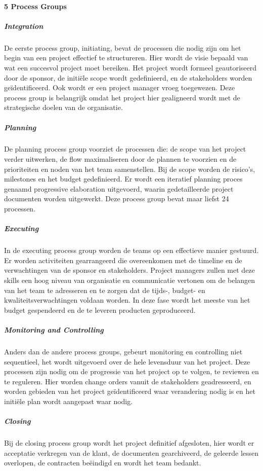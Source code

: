 \documentclass[]{article}
\begin{document}
\paragraph{5 Process Groups}
\subparagraph{Integration}
De eerste process group, initiating, bevat de processen die nodig zijn om het begin van een project effectief te structureren. Hier wordt de visie bepaald van wat een succesvol project moet bereiken.
Het project wordt formeel geautoriseerd door de sponsor, de initiële scope wordt gedefinieerd, en de stakeholders worden geïdentificeerd. Ook wordt er een project manager vroeg toegewezen.
Deze process group is belangrijk omdat het project hier gealigneerd wordt met de strategische doelen van de organisatie. 
\subparagraph{Planning}
De planning process group voorziet de processen die: de scope van het project verder uitwerken, de flow maximaliseren door de plannen te voorzien en de prioriteiten en noden van het team samenstellen.
Bij de scope worden de risico’s, milestones en het budget gedefinieerd. Er wordt een iteratief planning proces genaamd progressive elaboration uitgevoerd, waarin gedetailleerde project documenten worden uitgewerkt. 
Deze process group bevat maar liefst 24 processen. 
\subparagraph{Executing}
In de executing process group worden de teams op een effectieve manier gestuurd. Er worden activiteiten gearrangeerd die overeenkomen met de timeline en de verwachtingen van de sponsor en stakeholders. 
Project managers zullen met deze skills een hoog niveau van organisatie en communicatie vertonen om de belangen van het team te adresseren en te zorgen dat de tijds-, budget- en kwaliteitsverwachtingen voldaan worden. 
In deze fase wordt het meeste van het budget gespendeerd en de te leveren producten geproduceerd. 
\subparagraph{Monitoring and Controlling}
Anders dan de andere process groups, gebeurt monitoring en controlling niet sequentieel, het wordt uitgevoerd over de hele levensduur van het project. 
Deze processen zijn nodig om de progressie van het project op te volgen, te reviewen en te reguleren.
Hier worden change orders vanuit de stakeholders geadresseerd, en worden gebieden van het project geïdentificeerd waar verandering nodig is en het initiële plan wordt aangepast waar nodig.
\subparagraph{Closing}
Bij de closing process group wordt het project definitief afgesloten, hier wordt er acceptatie verkregen van de klant, de documenten gearchiveerd, de geleerde lessen overlopen, de contracten beëindigd en wordt het team bedankt. 
\end{document}
